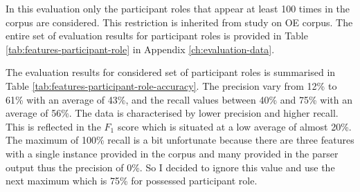     In this evaluation only the participant roles that appear at least 100 times in the corpus are considered. This restriction is inherited from \citet[160-162]{schulz2015me} study on OE corpus. The entire set of evaluation results for participant roles is provided in Table \ref{tab:features-participant-role} in Appendix \ref{ch:evaluation-data}. 
    
    The evaluation results for considered set of participant roles is summarised in Table \ref{tab:features-participant-role-accuracy}. The precision vary from 12\% to 61\% with an average of 43\%, and the recall values between 40\% and 75\% with an average of 56\%. The data is characterised by lower precision and higher recall. This is reflected in the $F_1$ score which is situated at a low average of almost 20\%. The maximum of 100\% recall is a bit unfortunate because there are three features with a single instance provided in the corpus and many provided in the parser output thus the precision of 0\%. So I decided to ignore this value and use the next maximum which is 75\% for possessed participant role.
    
